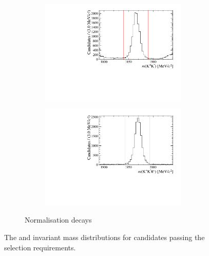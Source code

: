 \begin{figure}[!h]
   \begin{subfigure}[t]{1.0\textwidth}
      \centering
      \begin{subfigure}[t]{0.40\textwidth}
         \centering
         \includegraphics[width=1.0\textwidth]{figs/Selection/Phimass_KKPi_B2DsD0.pdf}
         \caption{\decay{\Dsp}{\Kp\Km\pip}}
      \end{subfigure}
      \begin{subfigure}[t]{0.40\textwidth}
         \centering
         \includegraphics[width=1.0\textwidth]{figs/Selection/Dmass_KKPi_B2DsD0.pdf}
      \end{subfigure}
      \caption{Normalisation \decay{\Bp}{\Dsp\Dzb} decays}
   \end{subfigure}
   \caption{The \Dsp and \Kp\Km invariant mass distributions for \decay{\Bp}{\Dsp\Kp\Km} candidates passing the selection requirements.}
   \label{fig:d_KK_mass}   
\end{figure}

